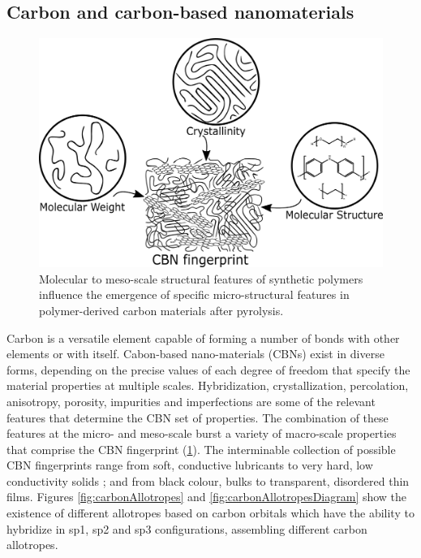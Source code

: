 \subsection{Carbon and carbon-based nanomaterials}

\begin{figure}[!th]
\centering
\includegraphics[scale=0.37]{./Figures/CBNfingerprint.png}
\decoRule
\caption[Fingerprint of Carbon-based Nano-materials]{Molecular to meso-scale structural features of synthetic polymers influence the emergence of specific micro-structural features in polymer-derived carbon materials after pyrolysis.}
\label{fig:CBNfingerprint}
\end{figure}

Carbon is a versatile element capable of forming a number of bonds with other elements or with itself. Cabon-based nano-materials (CBNs) exist in diverse forms, depending on the precise values of each degree of freedom that specify the material properties at multiple scales. Hybridization, crystallization, percolation, anisotropy, porosity, impurities and imperfections are some of the relevant features that determine the CBN set of properties. The combination of these features at the micro- and meso-scale burst a variety of macro-scale properties that comprise the CBN fingerprint (\ref{fig:CBNfingerprint}). The interminable collection of possible CBN fingerprints range from soft, conductive lubricants to very hard, low conductivity solids \cite{Hugh1994}; and from black colour, bulks to transparent, disordered thin films. \cite{McCreery2008} Figures \ref{fig:carbonAllotropes} and \ref{fig:carbonAllotropesDiagram} show the existence of different allotropes based on carbon orbitals which have the ability to hybridize in sp1, sp2 and sp3 configurations, assembling different carbon allotropes.

